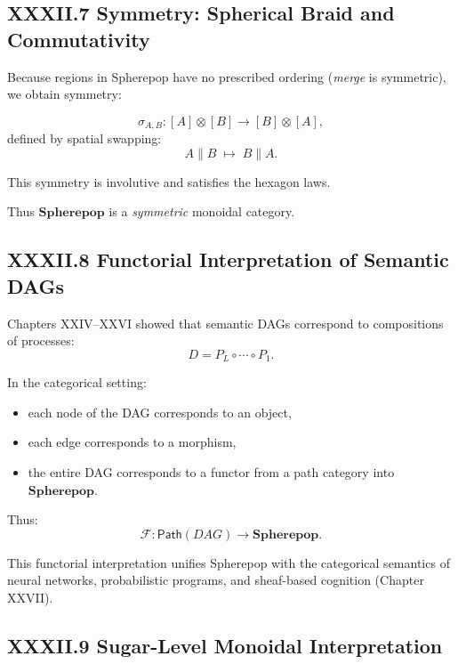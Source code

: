 \documentclass[12pt,letterpaper]{article}
\begin{document}
\subsection{XXXII.7 Symmetry: Spherical Braid and Commutativity}

Because regions in Spherepop have no prescribed ordering (\emph{merge} is symmetric), we obtain symmetry:

\[
\sigma_{A,B} : [A] \otimes [B] \to [B] \otimes [A],
\]
defined by spatial swapping:
\[
A \parallel B \;\mapsto\; B \parallel A.
\]

This symmetry is involutive and satisfies the hexagon laws.

Thus $\mathbf{Spherepop}$ is a \emph{symmetric} monoidal category.

\subsection{XXXII.8 Functorial Interpretation of Semantic DAGs}

Chapters XXIV--XXVI showed that semantic DAGs correspond to compositions of processes:
\[
D = P_L \circ \cdots \circ P_1.
\]

In the categorical setting:

\begin{itemize}
    \item each node of the DAG corresponds to an object,
    \item each edge corresponds to a morphism,
    \item the entire DAG corresponds to a functor from a path category into $\mathbf{Spherepop}$.
\end{itemize}

Thus:
\[
\mathcal{F} : \mathsf{Path}(DAG) \to \mathbf{Spherepop}.
\]

This functorial interpretation unifies Spherepop with the categorical semantics of neural networks, probabilistic programs, and sheaf-based cognition (Chapter XXVII).

\subsection{XXXII.9 Sugar-Level Monoidal Interpretation}
\end{document}
